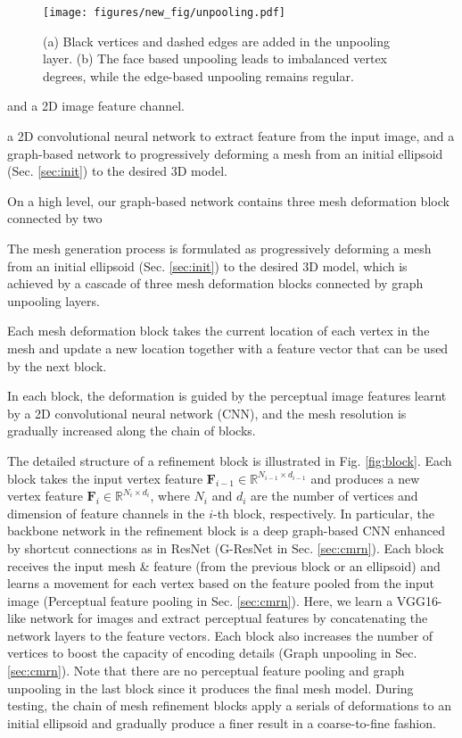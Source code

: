 \documentclass[runningheads]{llncs}
\def\bfF{\mathbf{F}}
\def\bbR{\mathbb{R}}
\newcommand{\figref}[1]{Fig. \ref{#1}}
\newcommand{\secref}[1]{Sec. \ref{#1}}
\begin{document}
\begin{figure}[t]
\centering
\texttt{[image: figures/new\_fig/unpooling.pdf]}
\caption{(a) Black vertices and dashed edges are added in the unpooling layer. (b) The face based unpooling leads to imbalanced vertex degrees, while the edge-based unpooling remains regular.}
\label{fig:unpooling}
\end{figure}


\iffalse
  and a 2D image feature channel.



a 2D convolutional neural network to extract feature from the input image, and a graph-based network to progressively deforming a mesh from an initial ellipsoid (\secref{sec:init}) to the desired 3D model.



On a high level, our graph-based network contains three mesh deformation block connected by two 




The mesh generation process is formulated as progressively deforming a mesh from an initial ellipsoid (\secref{sec:init}) to the desired 3D model, which is achieved by a cascade of three mesh deformation blocks connected by graph unpooling layers.


Each mesh deformation block takes the current location of each vertex in the mesh and update a new location together with a feature vector that can be used by the next block.



In each block, the deformation is guided by the perceptual image features learnt by a 2D convolutional neural network (CNN), and the mesh resolution is gradually increased along the chain of blocks.

The detailed structure of a refinement block is illustrated in \figref{fig:block}. Each block takes the input vertex feature $\bfF_{i-1}\in\bbR^{N_{i-1}\times d_{i-1}}$ and produces a new vertex feature $\bfF_i\in\bbR^{N_i\times d_i}$, where $N_i$ and $d_i$ are the number of vertices and dimension of feature channels in the $i$-th block, respectively. In particular, the backbone network in the refinement block is a deep graph-based CNN \cite{} enhanced by shortcut connections as in ResNet \cite{} (G-ResNet in \secref{sec:cmrn}).
Each block receives the input mesh \& feature (from the previous block or an ellipsoid) and learns a movement for each vertex based on the feature pooled from the input image (Perceptual feature pooling in \secref{sec:cmrn}). Here, we learn a VGG16-like network for images and extract perceptual features \cite{} by concatenating the network layers to the feature vectors.
Each block also increases the number of vertices to boost the capacity of encoding details (Graph unpooling in \secref{sec:cmrn}).  
Note that there are no perceptual feature pooling and graph unpooling in the last block since it produces the final mesh model. 
During testing, the chain of mesh refinement blocks apply a serials of deformations to an initial ellipsoid and gradually produce a finer result in a coarse-to-fine fashion.
\end{document}
